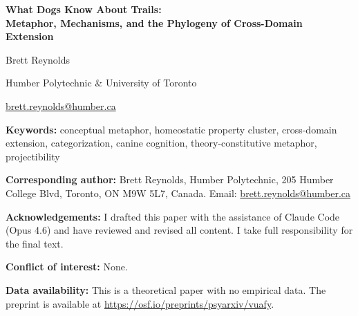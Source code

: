 \documentclass[12pt]{article}
\begin{document}
\thispagestyle{empty}

\begin{center}
{\Large\bfseries What Dogs Know About Trails:\\
Metaphor, Mechanisms, and the Phylogeny of Cross-Domain Extension}

\bigskip\bigskip

Brett Reynolds 

\medskip

Humber Polytechnic \& University of Toronto

\medskip

\href{mailto:brett.reynolds@humber.ca}{brett.reynolds@humber.ca}
\end{center}

\bigskip

\noindent\textbf{Keywords:} conceptual metaphor, homeostatic property cluster, cross-domain extension, categorization, canine cognition, theory-constitutive metaphor, projectibility

\bigskip

\noindent\textbf{Corresponding author:} Brett Reynolds, Humber Polytechnic, 205 Humber College Blvd, Toronto, ON M9W 5L7, Canada. Email: \href{mailto:brett.reynolds@humber.ca}{brett.reynolds@humber.ca}

\bigskip

\noindent\textbf{Acknowledgements:} I drafted this paper with the assistance of Claude Code (Opus 4.6) and have reviewed and revised all content. I take full responsibility for the final text.

\bigskip

\noindent\textbf{Conflict of interest:} None.

\bigskip

\noindent\textbf{Data availability:} This is a theoretical paper with no empirical data. The preprint is available at \url{https://osf.io/preprints/psyarxiv/vuafy}.
\end{document}
